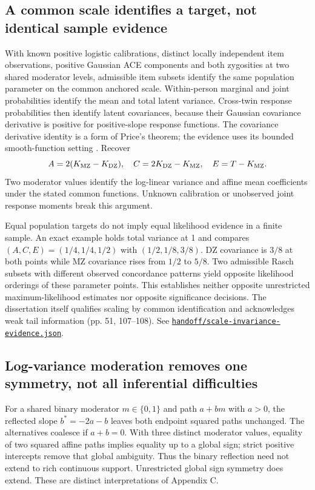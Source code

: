\documentclass[11pt]{article}
\newcommand{\file}[1]{\href{https://github.com/alectionary/vibe-math/blob/master/formalization/schwabe-psychometric-genetics/#1}{\nolinkurl{#1}}}
\begin{document}
\subsection{A common scale identifies a target, not identical sample evidence}
With known positive logistic calibrations, distinct locally independent item observations, positive Gaussian ACE components and both zygosities at two shared moderator levels, admissible item subsets identify the same population parameter on the common anchored scale. Within-person marginal and joint probabilities identify the mean and total latent variance. Cross-twin response probabilities then identify latent covariances, because their Gaussian covariance derivative is positive for positive-slope response functions. The covariance derivative identity is a form of Price's theorem; the evidence uses its bounded smooth-function setting \citep{voigtlaender2020}. Recover
\[
 A=2(K_{\rm MZ}-K_{\rm DZ}),\quad C=2K_{\rm DZ}-K_{\rm MZ},\quad E=T-K_{\rm MZ}.
\]
Two moderator values identify the log-linear variance and affine mean coefficients under the stated common functions. Unknown calibration or unobserved joint response moments break this argument.

Equal population targets do not imply equal likelihood evidence in a finite sample. An exact example holds total variance at 1 and compares $(A,C,E)=(1/4,1/4,1/2)$ with $(1/2,1/8,3/8)$. DZ covariance is $3/8$ at both points while MZ covariance rises from $1/2$ to $5/8$. Two admissible Rasch subsets with different observed concordance patterns yield opposite likelihood orderings of these parameter points. This establishes neither opposite unrestricted maximum-likelihood estimates nor opposite significance decisions. The dissertation itself qualifies scaling by common identification and acknowledges weak tail information (pp. 51, 107--108). See \file{handoff/scale-invariance-evidence.json}.

\subsection{Log-variance moderation removes one symmetry, not all inferential difficulties}
For a shared binary moderator $m\in\{0,1\}$ and path $a+bm$ with $a>0$, the reflected slope $b^*=-2a-b$ leaves both endpoint squared paths unchanged. The alternatives coalesce if $a+b=0$. With three distinct moderator values, equality of two squared affine paths implies equality up to a global sign; strict positive intercepts remove that global ambiguity. Thus the binary reflection need not extend to rich continuous support. Unrestricted global sign symmetry does extend. These are distinct interpretations of Appendix C.
\end{document}
